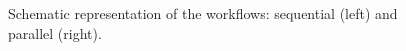 \begin{figure}[!htp]
	\begin{center}
		\caption{Schematic representation of the \ttDilepKinFit workflows: sequential (left) and parallel (right).}
		\label{fig:SeqPipeline}
	\end{center}
\end{figure}

